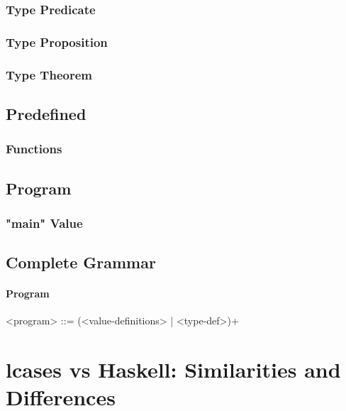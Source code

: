 \documentclass{article}
\begin{document}
\subsubsection{Type Predicate}

\subsubsection{Type Proposition}

\subsubsection{Type Theorem}

\subsection{Predefined}

\subsubsection{Functions}

\subsection{Program}

\subsubsection{"main" Value}

\subsection{Complete Grammar}

\setlength{\grammarparsep}{20pt}
\setlength{\grammarindent}{12em}

\paragraph{Program}
\begin{grammar}

<program> ::= (<value-definitions> | <type-def>)+

\end{grammar}

\section{lcases vs Haskell: Similarities and Differences}
\end{document}
